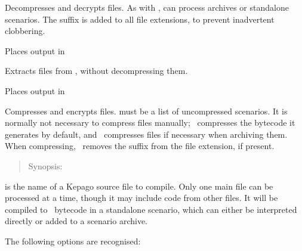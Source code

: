   \begin{nicelist}
  \item[\clboth{x}{extract}]
    Decompresses and decrypts files.  As with ,  can process
    archives or standalone scenarios.  The suffix  is added
    to all file extensions, to prevent inadvertent clobbering.
    \begin{extraopts}
    \item[\clbarg{o}{outdir}{DIR}]
      Places output in 
    \end{extraopts}
  \item[\clboth{b}{break}]
    Extracts files from , without decompressing them.
    \begin{extraopts}
    \item[\clbarg{o}{outdir}{DIR}]
      Places output in 
    \end{extraopts}
  \item[\clboth{c}{compress}]
    Compresses and encrypts files.   must be a list of
    uncompressed scenarios.  It is normally not necessary to compress files
    manually; \compiler\ compresses the bytecode it generates by default, and
    \archiver\ compresses files if necessary when archiving them.  When
    compressing, \archiver\ removes the suffix  from the file
    extension, if present.
  \end{nicelist}

\clearpage
{}

  \begin{quote}
    Synopsis:   
  \end{quote}

  \noindent{} is the name of a Kepago source file to compile.  Only
  one main file can be processed at a time, though it may include code from other
  files.  It will be compiled to \reallive\ bytecode in a standalone scenario, 
  which can either be interpreted directly or added to a scenario archive.

  The following options are recognised:

